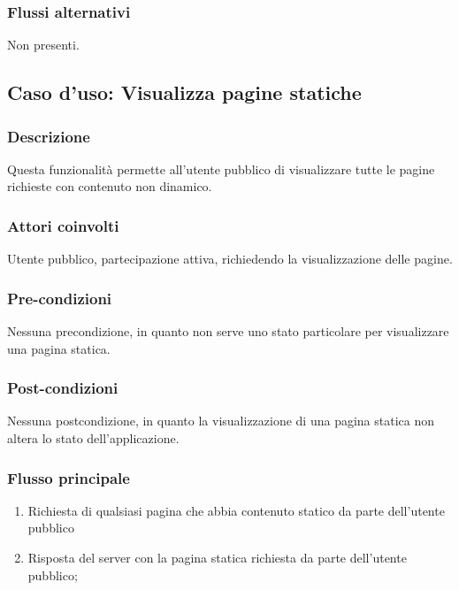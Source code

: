 \subsubsection*{Flussi alternativi}
Non presenti.

%
%
\subsection{Caso d'uso: Visualizza pagine statiche}

	\subsubsection*{Descrizione}
	Questa funzionalità permette all'utente pubblico di visualizzare tutte le pagine richieste con contenuto non dinamico.
	
	\subsubsection*{Attori coinvolti}
	Utente pubblico, partecipazione attiva, richiedendo la visualizzazione delle pagine.
	
	\subsubsection*{Pre-condizioni}
	Nessuna precondizione, in quanto non serve uno stato particolare per visualizzare una pagina statica.
	
	\subsubsection*{Post-condizioni}
	Nessuna postcondizione, in quanto la visualizzazione di una pagina statica non altera lo stato dell'applicazione.
	
	\subsubsection*{Flusso principale}
	
	\begin{enumerate}
		
		\item
		Richiesta di qualsiasi pagina che abbia contenuto statico da parte dell'utente pubblico
		
		\item
		Risposta del server con la pagina statica richiesta da parte dell'utente pubblico;
		
	\end{enumerate}
	
